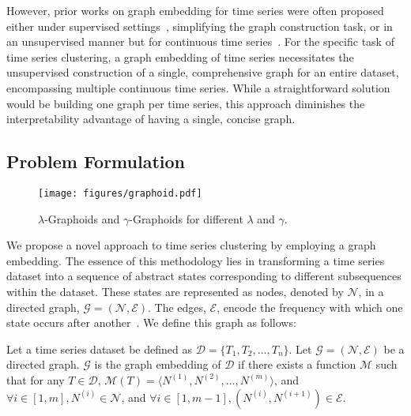However, prior works on graph embedding for time series were often proposed either under supervised settings~\cite{9477138}, simplifying the graph construction task, or in an unsupervised manner but for continuous time series~\cite{Series2GraphPaper}.
For the specific task of time series clustering, a graph embedding of time series necessitates the unsupervised construction of a single, comprehensive graph for an entire dataset, encompassing multiple continuous time series. While a straightforward solution would be building one graph per time series, this approach diminishes the interpretability advantage of having a single, concise graph.


\subsection{Problem Formulation}
\label{sec:Probdef}

\begin{figure}[tb]
 \centering
\texttt{[image: figures/graphoid.pdf]}

 \caption{$\lambda$-Graphoids and $\gamma$-Graphoids for different $\lambda$ and $\gamma$.}
 \label{fig:def}
\vspace{-0.3cm}
\end{figure}

We propose a novel 
approach to time series clustering by employing a graph embedding. The essence of this methodology lies in transforming a time series dataset into a sequence of abstract states corresponding to different subsequences within the dataset. These states are represented as nodes, denoted by $\mathcal{N}$, in a directed graph, $\mathcal{G}=(\mathcal{N},\mathcal{E})$. The edges, $\mathcal{E}$, encode the frequency with which one state occurs after another~\cite{Series2GraphPaper}. We define this graph as follows:

\begin{definition}   
Let a time series dataset be defined as $\mathcal{D} = \{T_1,T_2,...,T_n\}$. Let $\mathcal{G}=(\mathcal{N},\mathcal{E})$ be a directed graph. 
$\mathcal{G}$ is the graph embedding of $\mathcal{D}$ if there exists a function $\mathcal{M}$ such that for any $T \in \mathcal{D}$, $\mathcal{M}(T) =  \langle N^{(1)},N^{(2)},...,N^{(m)} \rangle $, and  $\forall i \in [1,m], N^{(i)} \in \mathcal{N}$, and $\forall i \in [1,m-1], (N^{(i)},N^{(i+1)}) \in \mathcal{E}$. 
\label{defGraph}  
\end{definition}

